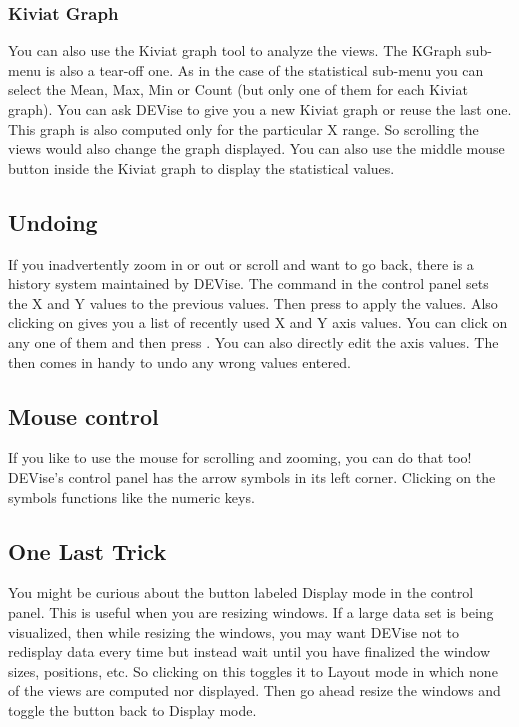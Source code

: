 \subsubsection{Kiviat Graph}

	
You can also use the Kiviat graph tool to analyze the views. The
KGraph sub-menu is also a tear-off one. As in the case of the
statistical sub-menu you can select the Mean, Max, Min or Count (but
only one of them for each Kiviat graph). You can ask DEVise to give
you a new Kiviat graph or reuse the last one. This graph is also
computed only for the particular X range. So scrolling the views would
also change the graph displayed. You can also use the middle mouse
button inside the Kiviat graph to display the statistical values.

\subsection{Undoing}


If you inadvertently zoom in or out or scroll and want to go back,
there is a history system maintained by DEVise. The 
command in the control panel sets the X and Y values to the previous
values. Then press  to apply the values. Also clicking on
 gives you a list of recently used X and Y axis
values. You can click on any one of them and then press
. You can also directly edit the axis values. The
 then comes in handy to undo any wrong values entered.

\subsection{Mouse control}

If you like to use the mouse for scrolling and zooming, you can do
that too! DEVise's control panel has the arrow symbols in its left
corner. Clicking on the symbols functions like the numeric keys.

\subsection{One Last Trick}

You might be curious about the button labeled Display mode in the
control panel. This is useful when you are resizing windows. If a
large data set is being visualized, then while resizing the windows,
you may want DEVise not to redisplay data every time but instead wait
until you have finalized the window sizes, positions, etc. So clicking
on this toggles it to Layout mode in which none of the views are
computed nor displayed. Then go ahead resize the windows and toggle
the button back to Display mode.

